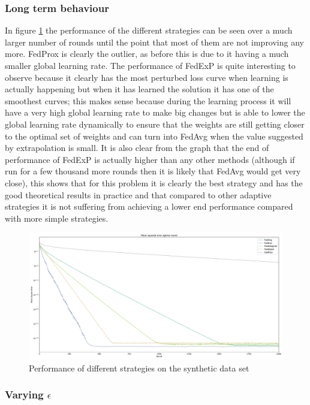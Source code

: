 \documentclass{article}
\begin{document}
\subsubsection{Long term behaviour}

In figure \ref{fig:2000RoundsSynthetic} the performance of the different strategies can be seen over a much larger number of rounds until the point that most of them are not improving any more.  FedProx is clearly the outlier, as before this is due to it having a much smaller global learning rate.  The performance of FedExP is quite interesting to observe because it clearly has the most perturbed loss curve when learning is actually happening but when it has learned the solution it has one of the smoothest curves; this makes sense because during the learning process it will have a very high global learning rate to make big changes but is able to lower the global learning rate dynamically to ensure that the weights are still getting closer to the optimal set of weights and can turn into FedAvg when the value suggested by extrapolation is small.  It is also clear from the graph that the end of performance of FedExP is actually higher than any other methods (although if run for a few thousand more rounds then it is likely that FedAvg would get very close), this shows that for this problem it is clearly the best strategy and has the good theoretical results in practice and that compared to other adaptive strategies it is not suffering from achieving a lower end performance compared with more simple strategies.

\begin{figure}
    \centerline{\includegraphics[width=.85\linewidth]{figs/synthetic_2000Rounds.pdf}}
    \caption{Performance of different strategies on the synthetic data set}
    \label{fig:2000RoundsSynthetic}
\end{figure}

\subsubsection{Varying $\epsilon$}
\end{document}
